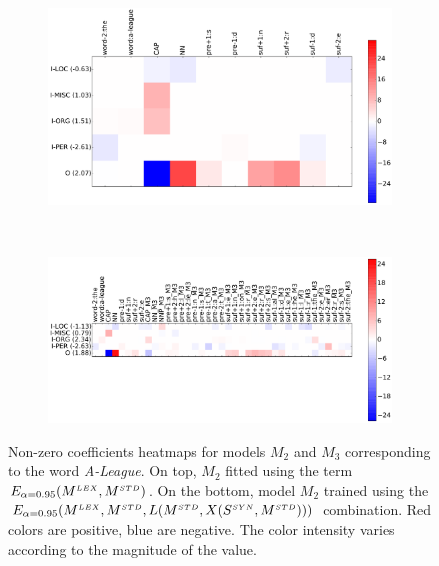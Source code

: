 \begin{figure}
	\centering
	\begin{subfigure}[t]{.9\textwidth}
	\captionsetup{width=\textwidth}
	\centering
	\includegraphics[width=1\linewidth]{images/Chapitre4/M2_1140.pdf}
	\label{fig:trans_M22}
	\end{subfigure}\\%
	\begin{subfigure}[t]{.9\textwidth}
	\captionsetup{width=\textwidth}
	\centering
	\includegraphics[width=1\linewidth]{images/Chapitre4/M3_1140.pdf}
	\label{fig:trans_M3}
	\end{subfigure}
	\caption{Non-zero coefficients heatmaps   for models $M_2$ and $M_3$ corresponding to the word \textit{A-League}. On top, $M_2$ fitted using the term $E_{\alpha=0.95}(M^{\scriptscriptstyle LEX}, M^{\scriptscriptstyle STD})$. On the bottom, model  $M_2$ trained using the  $E_{\alpha=0.95}(M^{\scriptscriptstyle LEX}, M^{\scriptscriptstyle STD}, L(M^{\scriptscriptstyle STD}, X(S^{\scriptscriptstyle SYN}, M^{\scriptscriptstyle STD})))$ combination. Red colors are positive, blue are negative. The color intensity varies according to the magnitude of the value.}
	\label{fig:trans_M2_M3}
\end{figure}



